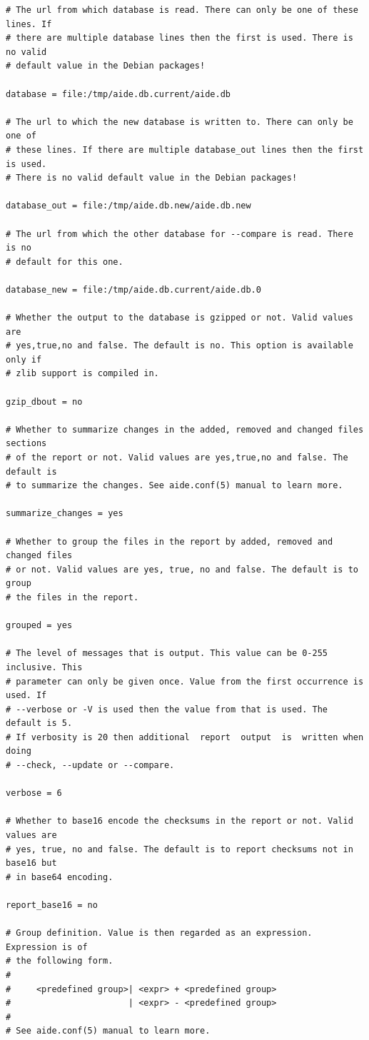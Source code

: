 \documentclass[thesis]{subfiles}
\begin{document}
\begin{lstlisting}
# The url from which database is read. There can only be one of these lines. If
# there are multiple database lines then the first is used. There is no valid
# default value in the Debian packages!

database = file:/tmp/aide.db.current/aide.db

# The url to which the new database is written to. There can only be one of
# these lines. If there are multiple database_out lines then the first is used.
# There is no valid default value in the Debian packages!

database_out = file:/tmp/aide.db.new/aide.db.new

# The url from which the other database for --compare is read. There is no
# default for this one.

database_new = file:/tmp/aide.db.current/aide.db.0

# Whether the output to the database is gzipped or not. Valid values are
# yes,true,no and false. The default is no. This option is available only if
# zlib support is compiled in.

gzip_dbout = no

# Whether to summarize changes in the added, removed and changed files sections
# of the report or not. Valid values are yes,true,no and false. The default is
# to summarize the changes. See aide.conf(5) manual to learn more.

summarize_changes = yes

# Whether to group the files in the report by added, removed and changed files
# or not. Valid values are yes, true, no and false. The default is to group
# the files in the report.

grouped = yes

# The level of messages that is output. This value can be 0-255 inclusive. This
# parameter can only be given once. Value from the first occurrence is used. If
# --verbose or -V is used then the value from that is used. The default is 5.
# If verbosity is 20 then additional  report  output  is  written when doing
# --check, --update or --compare.

verbose = 6

# Whether to base16 encode the checksums in the report or not. Valid values are
# yes, true, no and false. The default is to report checksums not in base16 but
# in base64 encoding.

report_base16 = no

# Group definition. Value is then regarded as an expression. Expression is of
# the following form.
#
#     <predefined group>| <expr> + <predefined group>
#                       | <expr> - <predefined group>
#
# See aide.conf(5) manual to learn more.


\end{lstlisting}
\end{document}
